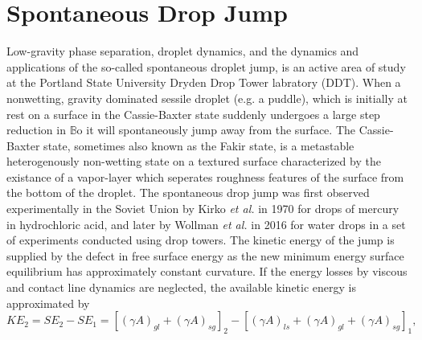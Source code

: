 \documentclass[12pt,a4paper,oneside]{book}
\begin{document}
\section{Spontaneous Drop Jump}
Low-gravity phase separation, droplet dynamics, and the dynamics and applications of the so-called spontaneous droplet jump, is an active area of study at the Portland State University Dryden Drop Tower labratory (DDT). When a nonwetting, gravity dominated sessile droplet (e.g. a puddle), which is initially at rest on a surface in the Cassie-Baxter state suddenly undergoes a large step reduction in $\mathbb{B}\mbox{o}$ it will spontaneously jump away from the surface. The Cassie-Baxter state, sometimes also known as the Fakir state, is a metastable heterogenously non-wetting state on a textured surface characterized by the existance of a vapor-layer which seperates roughness features of the surface from the bottom of the droplet. The spontaneous drop jump was first observed experimentally in the Soviet Union by Kirko \emph{et al.}\cite{kirko_phenomenon_1970} in 1970 for drops of mercury in hydrochloric acid, and later by Wollman \emph{et al.} in 2016 for water drops in a set of experiments conducted using drop towers\cite{wollman_more_2016}. The kinetic energy of the jump is supplied by the defect in free surface energy as the new minimum energy surface equilibrium has approximately constant curvature. If the energy losses by viscous and contact line dynamics are neglected, the available kinetic energy is approximated by
\[KE_2 = SE_2 - SE_1 = [(\gamma A)_{gl} + (\gamma A)_{sg}]_2 - [(\gamma A)_{ls} + (\gamma A)_{gl} + (\gamma A)_{sg}]_1, \]
\end{document}
